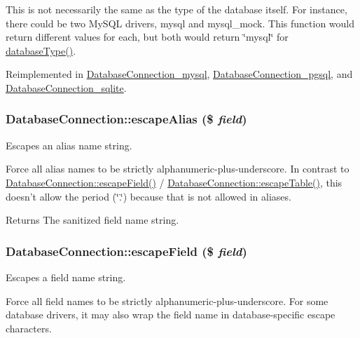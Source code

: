 This is not necessarily the same as the type of the database itself. For instance, there could be two MySQL drivers, mysql and mysql\_\-mock. This function would return different values for each, but both would return \char`\"{}mysql\char`\"{} for \hyperlink{classDatabaseConnection_a7dd7e76bc813c6a90a6d26a5529d67b0}{databaseType()}. 

Reimplemented in \hyperlink{classDatabaseConnection__mysql_a84daa0617157e0c291b081c7c648dc05}{DatabaseConnection\_\-mysql}, \hyperlink{classDatabaseConnection__pgsql_a60af8084115491a30ae1b6ee3552a958}{DatabaseConnection\_\-pgsql}, and \hyperlink{classDatabaseConnection__sqlite_aa941f2ff6edc55833dfa21b282c8c0dc}{DatabaseConnection\_\-sqlite}.\hypertarget{classDatabaseConnection_a400fea30d60f9477eb176d9fee36cfe2}{
\subsubsection[{escapeAlias}]{\setlength{\rightskip}{0pt plus 5cm}DatabaseConnection::escapeAlias (\$ {\em field})}}
\label{classDatabaseConnection_a400fea30d60f9477eb176d9fee36cfe2}
Escapes an alias name string.

Force all alias names to be strictly alphanumeric-\/plus-\/underscore. In contrast to \hyperlink{classDatabaseConnection_aae6a7cba6988731b2b84d645ea4de11c}{DatabaseConnection::escapeField()} / \hyperlink{classDatabaseConnection_a4ea565fbd6c6d1f258594b23a2e10e20}{DatabaseConnection::escapeTable()}, this doesn't allow the period (\char`\"{}.\char`\"{}) because that is not allowed in aliases.

\begin{DoxyReturn}{Returns}
The sanitized field name string. 
\end{DoxyReturn}
\hypertarget{classDatabaseConnection_aae6a7cba6988731b2b84d645ea4de11c}{
\subsubsection[{escapeField}]{\setlength{\rightskip}{0pt plus 5cm}DatabaseConnection::escapeField (\$ {\em field})}}
\label{classDatabaseConnection_aae6a7cba6988731b2b84d645ea4de11c}
Escapes a field name string.

Force all field names to be strictly alphanumeric-\/plus-\/underscore. For some database drivers, it may also wrap the field name in database-\/specific escape characters.

